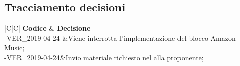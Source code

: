 \documentclass[a4paper,12pt]{article}
\begin{document}
	\newpage
	\subsection{Tracciamento decisioni}
	\begin{table}[tbph]
		\centering
		\begin{tabularx}{\textwidth}{|C|C|}
			\hline
			\textbf{Codice } & \textbf{Decisione} \\
			-VER\_2019-04-24 &Viene interrotta l'implementazione del blocco Amazon Music;\\
			-VER\_2019-04-24&Invio materiale richiesto nel alla proponente;\\
			\hline
		\end{tabularx}
		\caption{Tracciamento decisioni}
	\end{table}
	\label{LastPage}
\end{document}
